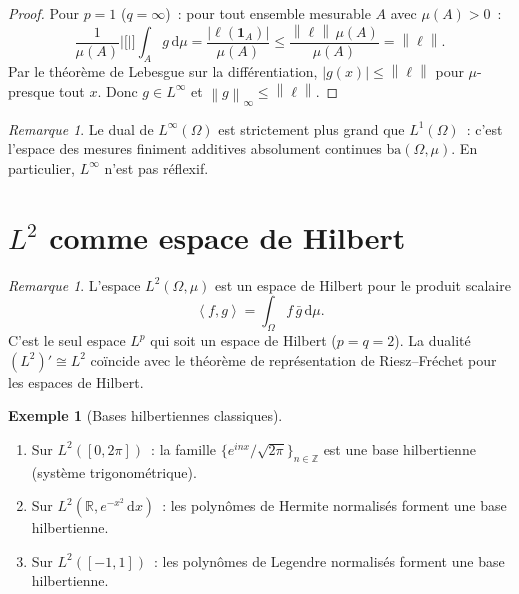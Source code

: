 \documentclass[a4paper,12pt]{book}
\newcommand{\Z}{\mathbb{Z}}
\newcommand{\R}{\mathbb{R}}
\newcommand{\dd}{\mathrm{d}}
\newcommand{\norm}[1]{\left\| #1 \right\|}
\newcommand{\abs}[1]{\left| #1 \right|}
\newcommand{\inner}[2]{\left\langle #1, #2 \right\rangle}
\theoremstyle{definition}
\newtheorem{exemple}[definition]{Exemple}
\theoremstyle{plain}
\theoremstyle{remark}
\newtheorem{remarque}[definition]{Remarque}
\begin{document}
\begin{proof}
Pour $p = 1$ ($q = \infty$)~: pour tout ensemble mesurable $A$ avec $\mu(A) > 0$~:
\[
  \frac{1}{\mu(A)}\abs[\bigg]{\int_A g\,\dd\mu}
    = \frac{\abs{\ell(\mathbf{1}_A)}}{\mu(A)}
    \le \frac{\norm{\ell}\,\mu(A)}{\mu(A)} = \norm{\ell}.
\]
Par le théorème de Lebesgue sur la différentiation,
$\abs{g(x)} \le \norm{\ell}$ pour $\mu$-presque tout $x$. Donc $g \in L^\infty$ et
$\norm{g}_\infty \le \norm{\ell}$.
\end{proof}

\begin{remarque}
Le dual de $L^\infty(\Omega)$ est strictement plus grand que $L^1(\Omega)$~: c'est
l'espace des mesures finiment additives absolument continues $\mathrm{ba}(\Omega, \mu)$.
En particulier, $L^\infty$ n'est pas réflexif.
\end{remarque}

\section{$L^2$ comme espace de Hilbert}

\begin{remarque}
L'espace $L^2(\Omega, \mu)$ est un espace de Hilbert pour le produit scalaire
\[
  \inner{f}{g} = \int_\Omega f\,\bar g\,\dd\mu.
\]
C'est le seul espace $L^p$ qui soit un espace de Hilbert ($p = q = 2$). La dualité
$(L^2)' \cong L^2$ coïncide avec le théorème de représentation de Riesz--Fréchet pour les
espaces de Hilbert.
\end{remarque}

\begin{exemple}[Bases hilbertiennes classiques]
\label{ex:bases-L2}
\begin{enumerate}[label=(\roman*)]
  \item Sur $L^2([0, 2\pi])$~: la famille $\{e^{inx}/\sqrt{2\pi}\}_{n \in \Z}$ est une
        base hilbertienne (système trigonométrique).
  \item Sur $L^2(\R, e^{-x^2}\,\dd x)$~: les polynômes de Hermite normalisés forment une
        base hilbertienne.
  \item Sur $L^2([-1,1])$~: les polynômes de Legendre normalisés forment une base
        hilbertienne.
\end{enumerate}
\end{exemple}
\end{document}
